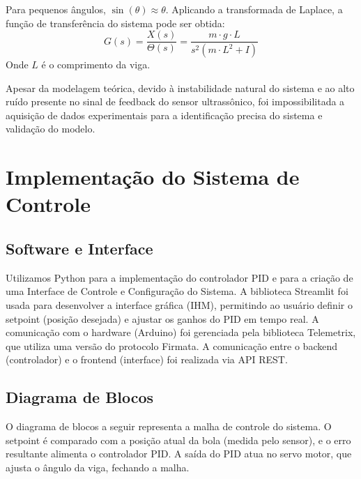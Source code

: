 \documentclass[a4paper, 11pt]{article}
\begin{document}
Para pequenos ângulos, $\sin(\theta) \approx \theta$. Aplicando a transformada de Laplace, a função de transferência do sistema pode ser obtida:
$$
G(s) = \frac{X(s)}{\Theta(s)} = \frac{m \cdot g \cdot L}{s^2(m \cdot L^2 + I)}
$$
Onde $L$ é o comprimento da viga.

Apesar da modelagem teórica, devido à instabilidade natural do sistema e ao alto ruído presente no sinal de feedback do sensor ultrassônico, foi impossibilitada a aquisição de dados experimentais para a identificação precisa do sistema e validação do modelo.

\section{Implementação do Sistema de Controle}
\subsection{Software e Interface}
Utilizamos Python para a implementação do controlador PID e para a criação de uma Interface de Controle e Configuração do Sistema. A biblioteca Streamlit foi usada para desenvolver a interface gráfica (IHM), permitindo ao usuário definir o setpoint (posição desejada) e ajustar os ganhos do PID em tempo real. A comunicação com o hardware (Arduino) foi gerenciada pela biblioteca Telemetrix, que utiliza uma versão do protocolo Firmata. A comunicação entre o backend (controlador) e o frontend (interface) foi realizada via API REST.

\subsection{Diagrama de Blocos}
O diagrama de blocos a seguir representa a malha de controle do sistema. O setpoint é comparado com a posição atual da bola (medida pelo sensor), e o erro resultante alimenta o controlador PID. A saída do PID atua no servo motor, que ajusta o ângulo da viga, fechando a malha.

\end{document}
